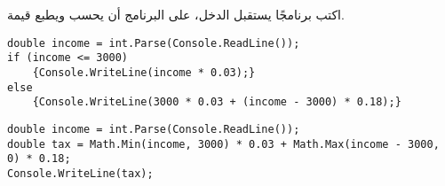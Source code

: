 \documentclass[12pt]{article}
\begin{document}
\begin{enumerate}[itemsep=2em]
اكتب برنامجًا يستقبل الدخل، على البرنامج أن يحسب ويطبع قيمة.

\ifwithsols
\begin{boxSolution}[1]
\begin{english}
\begin{verbatim}
double income = int.Parse(Console.ReadLine());
if (income <= 3000)
    {Console.WriteLine(income * 0.03);}
else
    {Console.WriteLine(3000 * 0.03 + (income - 3000) * 0.18);}
\end{verbatim}
\end{english}
\end{boxSolution}
\begin{boxSolution}[2]
\begin{english}
\begin{verbatim}
double income = int.Parse(Console.ReadLine());
double tax = Math.Min(income, 3000) * 0.03 + Math.Max(income - 3000, 0) * 0.18;
Console.WriteLine(tax);
\end{verbatim}
\end{english}
\end{boxSolution}
\fi


\end{enumerate}
\end{document}

